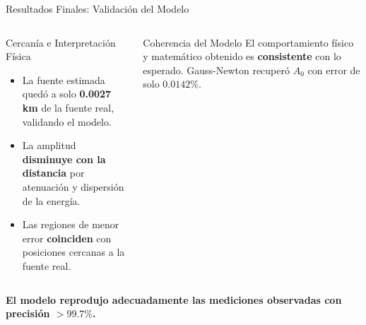 \begin{frame}{Resultados Finales: Validación del Modelo}
\begin{columns}[T]
        \begin{block}{Cercanía e Interpretación Física}
            \scriptsize
            \begin{itemize}
                \item La fuente estimada quedó a solo \textbf{0.0027 km} de la fuente real, validando el modelo.
                \vspace{0.1cm}
                \item La amplitud \textbf{disminuye con la distancia} por atenuación y dispersión de la energía.
                \vspace{0.1cm}
                \item Las regiones de menor error \textbf{coinciden} con posiciones cercanas a la fuente real.
            \end{itemize}
        \end{block}

        \vspace{0.2cm}

        \begin{block}{Coherencia del Modelo}
            \centering
            \scriptsize
            El comportamiento físico y matemático obtenido es \textbf{consistente} con lo esperado. Gauss-Newton recuperó $A_0$ con error de solo $0.0142\%$.
        \end{block}

    \end{columns}

    \vspace{0.15cm}
    \begin{center}
        \footnotesize
        \textbf{El modelo reprodujo adecuadamente las mediciones observadas con precisión $> 99.7\%$.}
    \end{center}

\end{frame}